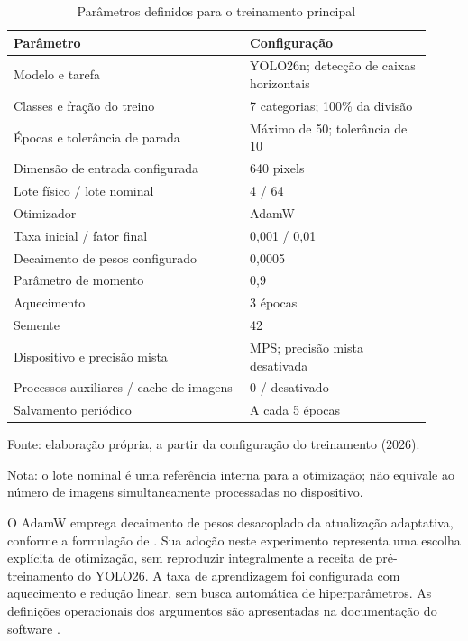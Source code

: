 \begin{table}[htbp]
\centering
\begin{minipage}{\linewidth}
\singlespacing\small
\caption{Parâmetros definidos para o treinamento principal}
\label{tab:met-treino}
\begin{tabular}{p{0.52\linewidth}p{0.40\linewidth}}
\hline
Parâmetro & Configuração \\
\hline
Modelo e tarefa & YOLO26n; detecção de caixas horizontais \\
Classes e fração do treino & 7 categorias; 100\% da divisão \\
Épocas e tolerância de parada & Máximo de 50; tolerância de 10 \\
Dimensão de entrada configurada & 640 pixels \\
Lote físico / lote nominal & 4 / 64 \\
Otimizador & AdamW \\
Taxa inicial / fator final & 0,001 / 0,01 \\
Decaimento de pesos configurado & 0,0005 \\
Parâmetro de momento & 0,9 \\
Aquecimento & 3 épocas \\
Semente & 42 \\
Dispositivo e precisão mista & MPS; precisão mista desativada \\
Processos auxiliares / cache de imagens & 0 / desativado \\
Salvamento periódico & A cada 5 épocas \\
\hline
\end{tabular}\par
\vspace{0.35em}\raggedright
Fonte: elaboração própria, a partir da configuração do treinamento (2026).\par
Nota: o lote nominal é uma referência interna para a otimização; não equivale ao número de imagens simultaneamente processadas no dispositivo.
\end{minipage}
\end{table}

O AdamW emprega decaimento de pesos desacoplado da atualização adaptativa, conforme a formulação de \textcite{loshchilov2019adamw}. Sua adoção neste experimento representa uma escolha explícita de otimização, sem reproduzir integralmente a receita de pré-treinamento do YOLO26. A taxa de aprendizagem foi configurada com aquecimento e redução linear, sem busca automática de hiperparâmetros. As definições operacionais dos argumentos são apresentadas na documentação do software \parencite{ultralyticsTreinamento}.

